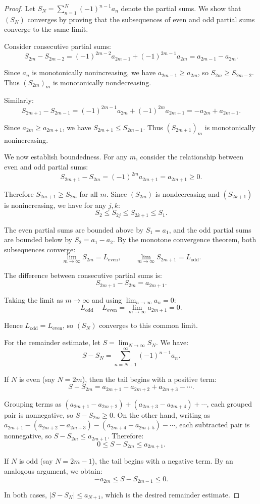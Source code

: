 \begin{proof}
    Let $S_N = \sum_{n=1}^N (-1)^{n-1} a_n$ denote the partial sums. We show that $(S_N)$ converges by proving that the subsequences of even and odd partial sums converge to the same limit.

    Consider consecutive partial sums:
    $$S_{2m} - S_{2m-2} = (-1)^{2m-2} a_{2m-1} + (-1)^{2m-1} a_{2m} = a_{2m-1} - a_{2m}.$$

    Since $a_n$ is monotonically nonincreasing, we have $a_{2m-1} \geq a_{2m}$, so $S_{2m} \geq S_{2m-2}$. Thus $(S_{2m})_m$ is monotonically nondecreasing.

    Similarly:
    $$S_{2m+1} - S_{2m-1} = (-1)^{2m-1} a_{2m} + (-1)^{2m} a_{{2m+1}} = -a_{2m} + a_{2m+1}.$$

    Since $a_{2m} \geq a_{2m+1}$, we have $S_{2m+1} \leq S_{2m-1}$. Thus $(S_{2m+1})_m$ is monotonically nonincreasing.

    We now establish boundedness. For any $m$, consider the relationship between even and odd partial sums:
    $$S_{2m+1} - S_{2m} = (-1)^{2m} a_{2m+1} = a_{2m+1} \geq 0.$$

    Therefore $S_{2m+1} \geq S_{2m}$ for all $m$. Since $(S_{2m})$ is nondecreasing and $(S_{2k+1})$ is nonincreasing, we have for any $j, k$:
    $$S_2 \leq S_{2j} \leq S_{2k+1} \leq S_1.$$

    The even partial sums are bounded above by $S_1 = a_1$, and the odd partial sums are bounded below by $S_2 = a_1 - a_2$. By the monotone convergence theorem, both subsequences converge:
    $$\lim_{m \to \infty} S_{2m} = L_{\text{even}}, \qquad \lim_{m \to \infty} S_{2m+1} = L_{\text{odd}}.$$

    The difference between consecutive partial sums is:
    $$S_{2m+1} - S_{2m} = a_{2m+1}.$$

    Taking the limit as $m \to \infty$ and using $\lim_{n \to \infty} a_n = 0$:
    $$L_{\text{odd}} - L_{\text{even}} = \lim_{m \to \infty} a_{2m+1} = 0.$$

    Hence $L_{\text{odd}} = L_{\text{even}}$, so $(S_N)$ converges to this common limit.

    For the remainder estimate, let $S = \lim_{N \to \infty} S_N$. We have:
    $$S - S_N = \sum_{n=N+1}^\infty (-1)^{n-1} a_n.$$

    If $N$ is even (say $N = 2m$), then the tail begins with a positive term:
    $$S - S_{2m} = a_{2m+1} - a_{2m+2} + a_{2m+3} - \cdots.$$

    Grouping terms as $(a_{2m+1} - a_{2m+2}) + (a_{2m+3} - a_{2m+4}) + \cdots$, each grouped pair is nonnegative, so $S - S_{2m} \geq 0$. On the other hand, writing as $a_{2m+1} - (a_{2m+2} - a_{2m+3}) - (a_{2m+4} - a_{2m+5}) - \cdots$, each subtracted pair is nonnegative, so $S - S_{2m} \leq a_{2m+1}$. Therefore:
    $$0 \leq S - S_{2m} \leq a_{2m+1}.$$

    If $N$ is odd (say $N = 2m-1$), the tail begins with a negative term. By an analogous argument, we obtain:
    $$-a_{2m} \leq S - S_{2m-1} \leq 0.$$

    In both cases, $|S - S_N| \leq a_{N+1}$, which is the desired remainder estimate.
\end{proof}
